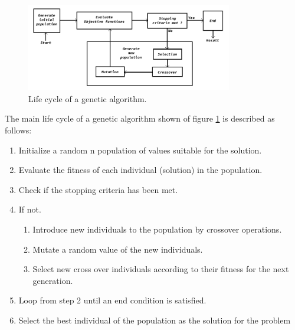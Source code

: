 \documentclass[conference]{IEEEtran}
\begin{document}
\begin{figure}[htbp]
\centerline{\includegraphics[width=90mm]{Images/ga_life_cycle.png}}
\caption{Life cycle of a genetic algorithm.}
\label{algorithm_model}
\end{figure}


The main life cycle of a genetic algorithm shown of figure \ref{algorithm_model}
is described as follows:
\begin{enumerate}
    \item Initialize a random n population of values suitable for the solution.
    \item Evaluate the fitness of each individual (solution) in the population.
    \item Check if the stopping criteria has been met.
    \item If not.
    \begin{enumerate}
        \item Introduce new individuals to the population by crossover
        operations.
        \item Mutate a random value of the new individuals.
        \item Select new cross over individuals according to their fitness for
        the next generation.
    \end{enumerate}
    \item Loop from step 2 until an end condition is satisfied.
    \item Select the best individual of the population as the solution for the
    problem
\end{enumerate}


\end{document}
